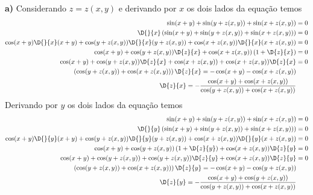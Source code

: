 \documentclass[a4paper,12pt,fleqn]{article}
\begin{document}
\begin{answer}
  \setlength{\jot}{6pt}
\vspace{\baselineskip}
\textbf{a)\;}
Considerando $z=z(x, y)$ e derivando por $x$ os dois lados da equação temos
\begin{align*}
  \sin(x+y) + \sin(y+z(x, y)) + \sin(x+z(x, y))                                     & = 0 \\
  \D{}{x}\left(\sin(x+y) + \sin(y+z(x, y)) + \sin(x+z(x, y))\right)                 & = 0 \\
  \cos(x+y)\D{}{x}(x+y) + \cos(y+z(x, y))\D{}{x}(y+z(x, y)) + \cos(x+z(x, y))\D{}{x}(x+z(x, y)) & = 0 \\
  \cos(x+y) + \cos(y+z(x, y))\D{z}{x} + \cos(x+z(x, y))\left(1+\D{z}{x}\right)      & = 0 \\
  \cos(x+y) + \cos(y+z(x, y))\D{z}{x} + \cos(x+z(x, y)) + \cos(x+z(x, y))\D{z}{x}   & = 0 \\
  \left(\cos(y+z(x, y))+\cos(x+z(x, y))\right)\D{z}{x}  = -\cos(x+y) - \cos(x+z(x, y))    \\
  \D{z}{x}  = -\frac{\cos(x+y)+\cos(x+z(x, y))}{\cos(y+z(x, y))+\cos(x+z(x, y))}
\end{align*}
Derivando por $y$ os dois lados da equação temos
\begin{align*}
  \sin(x+y) + \sin(y+z(x, y)) + \sin(x+z(x, y))                                     & = 0 \\
  \D{}{y}\left(\sin(x+y) + \sin(y+z(x, y)) + \sin(x+z(x, y))\right)                 & = 0 \\
  \cos(x+y)\D{}{y}(x+y) + \cos(y+z(x, y))\D{}{y}(y+z(x, y)) + \cos(x+z(x, y))\D{}{y}(x+z(x, y)) & = 0 \\
  \cos(x+y) + \cos(y+z(x, y))\left(1+\D{z}{y}\right) + \cos(x+z(x, y))\D{z}{y}      & = 0 \\
  \cos(x+y) + \cos(y+z(x, y)) + \cos(y+z(x, y))\D{z}{y} + \cos(x+z(x, y))\D{z}{y}         & = 0 \\
  \left(\cos(y+z(x, y)) + \cos(x+z(x, y))\right)\D{z}{y}  = -\cos(x+y)-\cos(y+z(x, y)) \\
  \D{z}{y}  = -\frac{\cos(x+y)+\cos(y+z(x, y))}{\cos(y+z(x, y)) + \cos(x+z(x, y))}
\end{align*}


\end{answer}
\end{document}
